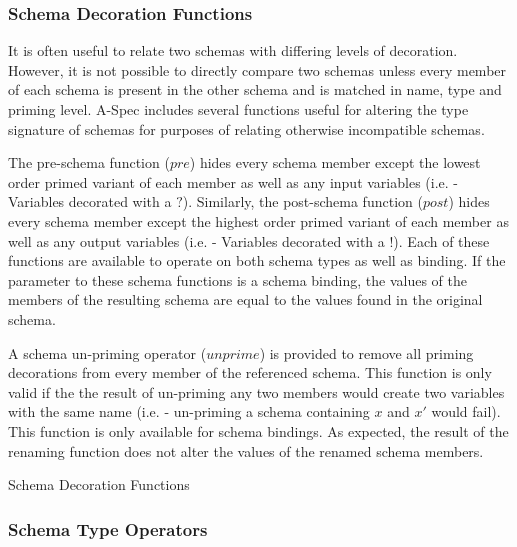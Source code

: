 \documentclass[letterpaper,10pt,draft]{book}
\begin{document}
\subsubsection{Schema Decoration Functions}
   \label{sect:SchDecorFunc}

It is often useful to relate two schemas with differing levels of decoration.  However,
it is not possible to directly compare two schemas unless every member of each schema
is present in the other schema and is matched in name, type and priming level.
A-Spec includes several functions useful for altering the type signature of schemas
for purposes of relating otherwise incompatible schemas.

The pre-schema function ($pre$) hides every schema member except the lowest order
primed variant of each member as well as any input variables (i.e. - Variables decorated
with a $?$).  Similarly, the post-schema function ($post$)  hides every schema member
except the highest order primed variant of each member as well as any output variables
(i.e. - Variables decorated with a $!$).  Each of these functions are available
to operate on both schema types as well as binding.  If the parameter to these schema
functions is a schema binding, the values of the members of the resulting schema
are equal to the values found in the original schema.

A schema un-priming operator ($unprime$) is provided to remove all priming decorations
from every member of the referenced schema.  This function is only valid if the
the result of un-priming any two members would create two variables with the same
name (i.e. - un-priming a schema containing $x$ and $x'$ would fail).  This function
is only available for schema bindings.  As expected, the result of the renaming
function does not alter the values of the renamed schema members.

\begin{example}
\begin{minipage}[t]{0.51\linewidth}
   
\end{minipage}
\begin{minipage}[t]{0.48\linewidth}
   \azsch
   
\end{minipage}

   \caption{Schema Decoration Functions}
   \label{ex:SchDecorFunc}
\end{example}

\subsubsection{Schema Type Operators}
   \label{sect:SchTypeOp}
\end{document}
